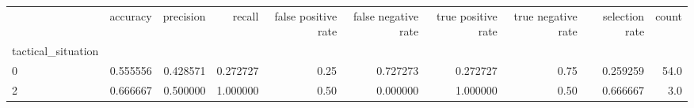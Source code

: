 \begin{tabular}{lrrrrrrrrr}
\toprule
{} &  accuracy &  precision &    recall &  false positive rate &  false negative rate &  true positive rate &  true negative rate &  selection rate &  count \\
tactical\_situation &           &            &           &                      &                      &                     &                     &                 &        \\
\midrule
0                  &  0.555556 &   0.428571 &  0.272727 &                 0.25 &             0.727273 &            0.272727 &                0.75 &        0.259259 &   54.0 \\
2                  &  0.666667 &   0.500000 &  1.000000 &                 0.50 &             0.000000 &            1.000000 &                0.50 &        0.666667 &    3.0 \\
\bottomrule
\end{tabular}
